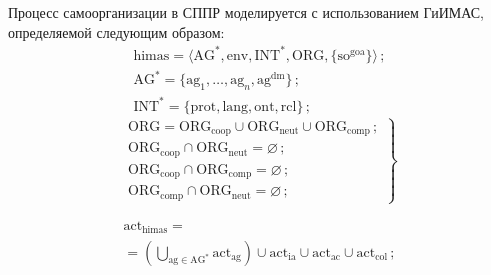 \begin{multicols}{2}
  Процесс самоорганизации в СППР моделируется с использованием  
ГиИМАС, определяемой следующим образом:
  \begin{gather}
  \mathrm{himas}= \langle \mathrm{AG}^*, \mathrm{env}, \mathrm{INT}^*, \mathrm{ORG}, 
  \{\mathrm{so}^{\mathrm{goa}}\}\rangle\,;\label{e1-lis}\\
  \mathrm{AG}^*=\{ \mathrm{ag}_1, \ldots , \mathrm{ag}_n, \mathrm{ag}^{\mathrm{dm}}\}\,;\label{e2-lis}\\
  \mathrm{INT}^*=\{ \mathrm{prot}, \mathrm{lang}, \mathrm{ont}, \mathrm{rcl}\}\,; \label{e3-lis}
  \end{gather}
  \begin{equation}
  \left.
  \begin{array}{c}
  \mathrm{ORG}=\mathrm{ORG}_{\mathrm{coop}}\cup \mathrm{ORG}_{\mathrm{neut}}\cup \mathrm{ORG}_{\mathrm{comp}}\,;\\[9pt]
  \mathrm{ORG}_{\mathrm{coop}}\cap \mathrm{ORG}_{\mathrm{neut}}=\varnothing\,;\\[9pt]
  \mathrm{ORG}_{\mathrm{coop}}\cap \mathrm{ORG}_{\mathrm{comp}}=\varnothing\,;\\[9pt]
  \mathrm{ORG}_{\mathrm{comp}}\cap \mathrm{ORG}_{\mathrm{neut}}=\varnothing\,;
  \end{array}
  \right\}
  \label{e4-lis}
  \end{equation} 
  
  \vspace*{-12pt}
  
  \noindent
  \begin{multline}
  \mathrm{act}_{\mathrm{himas}}={}\\
  {}=\left( \bigcup\limits_{\mathrm{ag}\in \mathrm{AG}^*} \mathrm{act}_{\mathrm{ag}}\right) \cup
\mathrm{act}_{\mathrm{ia}}\cup \mathrm{act}_{\mathrm{ac}}\cup \mathrm{act}_{\mathrm{col}}\,;\label{e5-lis}
\end{multline}

\vspace*{-12pt}


\end{multicols}
